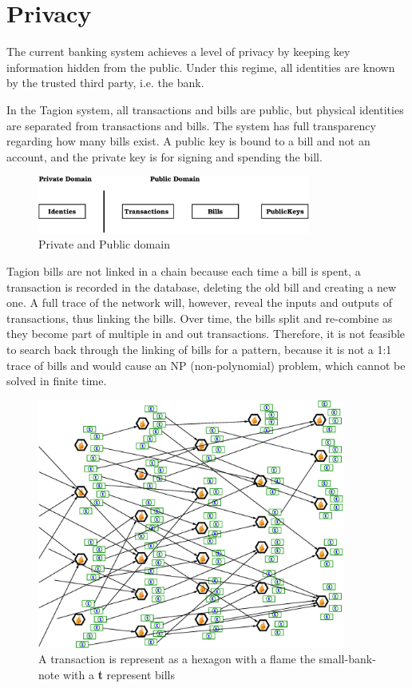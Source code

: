 \section{Privacy}
The current banking system achieves a level of privacy by keeping key information hidden from the public. Under this regime, all identities are known by the trusted third party, i.e. the bank.

In the Tagion system, all transactions and bills are public, but physical identities are separated from transactions and bills. The system has full transparency regarding how many bills exist. A public key is bound to a bill and not an account, and the private key is for signing and spending the bill.\\

\begin{figure}[H]
 \centering
 \includegraphics[width=0.8\textwidth]{fig/privacy.eps}
 \caption{Private and Public domain}
 \label{fig:private_domain}
\end{figure}

Tagion bills are not linked in a chain because each time a bill is spent, a transaction is recorded in the database, deleting the old bill and creating a new one. A full trace of the network will, however, reveal the inputs and outputs of transactions, thus linking the bills. Over time, the bills split and re-combine as they become part of multiple in and out transactions. Therefore, it is not feasible to search back through the linking of bills for a pattern, because it is not a 1:1 trace of bills and would cause an NP (non-polynomial) problem, which cannot be solved in finite time.\\

\begin{figure}[H]
 \centering
 \includegraphics[width=0.9\textwidth]{fig/transaction_inout.eps}
 \caption{A transaction is represent as a hexagon with a flame the small-bank-note with a {\bfseries{t}} represent bills}
 \label{fig:transaction_inout}
\end{figure}

